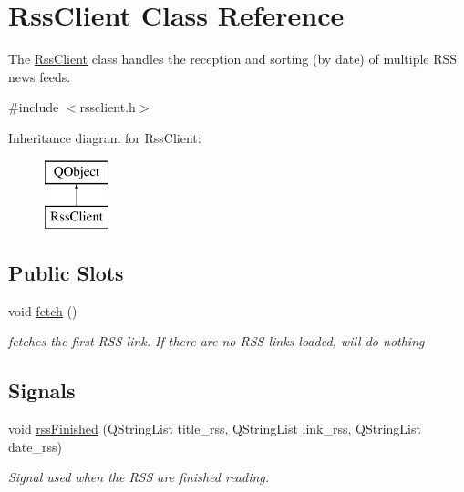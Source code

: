 \hypertarget{class_rss_client}{\section{Rss\+Client Class Reference}
\label{class_rss_client}
}


The \hyperlink{class_rss_client}{Rss\+Client} class handles the reception and sorting (by date) of multiple R\+S\+S news feeds.  




{\ttfamily \#include $<$rssclient.\+h$>$}

Inheritance diagram for Rss\+Client\+:\begin{figure}[H]
\begin{center}
\leavevmode
\includegraphics[height=2.000000cm]{class_rss_client}
\end{center}
\end{figure}
\subsection*{Public Slots}
\begin{DoxyCompactItemize}
\item 
\hypertarget{class_rss_client_a2f5ee7ba4e8780c9ed0601b5dd2e6beb}{void \hyperlink{class_rss_client_a2f5ee7ba4e8780c9ed0601b5dd2e6beb}{fetch} ()}\label{class_rss_client_a2f5ee7ba4e8780c9ed0601b5dd2e6beb}

\begin{DoxyCompactList}\small\item\em fetches the first R\+S\+S link. If there are no R\+S\+S links loaded, will do nothing \end{DoxyCompactList}\end{DoxyCompactItemize}
\subsection*{Signals}
\begin{DoxyCompactItemize}
\item 
void \hyperlink{class_rss_client_ab6d60bfd93285070055f5abddc4e3804}{rss\+Finished} (Q\+String\+List title\+\_\+rss, Q\+String\+List link\+\_\+rss, Q\+String\+List date\+\_\+rss)
\begin{DoxyCompactList}\small\item\em Signal used when the R\+S\+S are finished reading. \end{DoxyCompactList}\end{DoxyCompactItemize}
